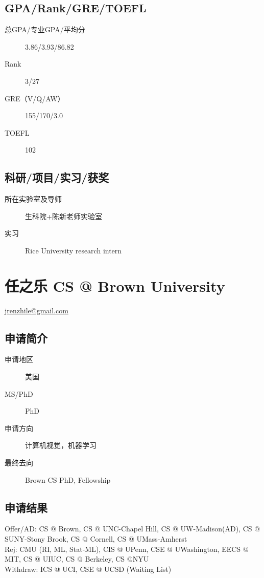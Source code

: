 \documentclass[11pt,fleqn,openany]{book} %
\begin{document}
\subsection*{GPA/Rank/GRE/TOEFL}
\begin{description}
\item[总GPA/专业GPA/平均分] 3.86/3.93/86.82
\item[Rank] 3/27
\item[GRE（V/Q/AW）] 155/170/3.0
\item[TOEFL] 102
\end{description}

\subsection*{科研/项目/实习/获奖}
\begin{description}
\item[所在实验室及导师] 生科院+陈新老师实验室
\item[实习] Rice University research intern
\end{description}
\clearpage
\section{任之乐 CS @ Brown University}
\hfill \href{mailto:jrenzhile@gmail.com}{jrenzhile@gmail.com}

\noindent\begin{minipage}[t]{0.45\textwidth}
\subsection*{申请简介}
\begin{description}
\item[申请地区] 美国
\item[MS/PhD] PhD
\item[申请方向] 计算机视觉，机器学习
\item[最终去向] Brown CS PhD, Fellowship
\end{description}
\end{minipage}
\hfill
\begin{minipage}[t]{0.45\textwidth}
\subsection*{申请结果}
\noindent Offer/AD: CS @ Brown, CS @ UNC-Chapel Hill, CS @ UW-Madison(AD), CS @ SUNY-Stony Brook, CS @ Cornell, CS @ UMass-Amherst\\
Rej: CMU (RI, ML, Stat-ML), CIS @ UPenn, CSE @ UWashington, EECS @ MIT, CS @ UIUC, CS @ Berkeley, CS @NYU\\
Withdraw: ICS @ UCI, CSE @ UCSD (Waiting List)
\end{minipage}
\end{document}
